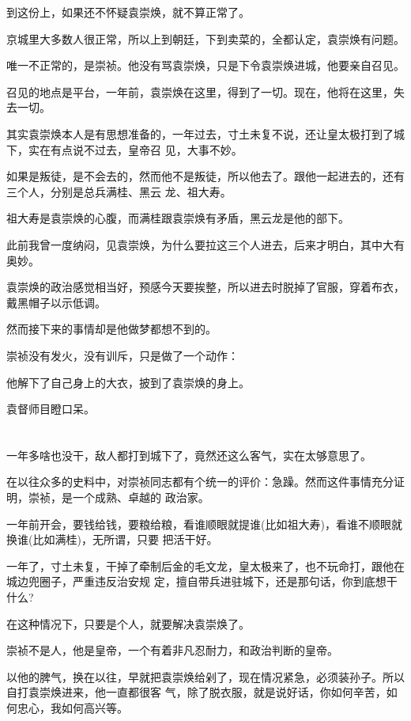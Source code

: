 \documentclass[11pt,a4paper,onecolumn]{article}
\begin{document}
到这份上，如果还不怀疑袁崇焕，就不算正常了。

京城里大多数人很正常，所以上到朝廷，下到卖菜的，全都认定，袁崇焕有问题。

唯一不正常的，是崇祯。他没有骂袁崇焕，只是下令袁崇焕进城，他要亲自召见。

召见的地点是平台，一年前，袁崇焕在这里，得到了一切。现在，他将在这里，失去一切。

其实袁崇焕本人是有思想准备的，一年过去，寸土未复不说，还让皇太极打到了城下，实在有点说不过去，皇帝召
见，大事不妙。

如果是叛徒，是不会去的，然而他不是叛徒，所以他去了。跟他一起进去的，还有三个人，分别是总兵满桂、黑云
龙、祖大寿。

祖大寿是袁崇焕的心腹，而满桂跟袁崇焕有矛盾，黑云龙是他的部下。

此前我曾一度纳闷，见袁崇焕，为什么要拉这三个人进去，后来才明白，其中大有奥妙。

袁崇焕的政治感觉相当好，预感今天要挨整，所以进去时脱掉了官服，穿着布衣，戴黑帽子以示低调。

然而接下来的事情却是他做梦都想不到的。

崇祯没有发火，没有训斥，只是做了一个动作：

他解下了自己身上的大衣，披到了袁崇焕的身上。

袁督师目瞪口呆。

\section[\thesection]{}

一年多啥也没干，敌人都打到城下了，竟然还这么客气，实在太够意思了。

在以往众多的史料中，对崇祯同志都有个统一的评价：急躁。然而这件事情充分证明，崇祯，是一个成熟、卓越的
政治家。

一年前开会，要钱给钱，要粮给粮，看谁顺眼就提谁(比如祖大寿)，看谁不顺眼就换谁(比如满桂)，无所谓，只要
把活干好。

一年了，寸土未复，干掉了牵制后金的毛文龙，皇太极来了，也不玩命打，跟他在城边兜圈子，严重违反治安规
定，擅自带兵进驻城下，还是那句话，你到底想干什么?

在这种情况下，只要是个人，就要解决袁崇焕了。

崇祯不是人，他是皇帝，一个有着非凡忍耐力，和政治判断的皇帝。

以他的脾气，换在以往，早就把袁崇焕给剁了，现在情况紧急，必须装孙子。所以自打袁崇焕进来，他一直都很客
气，除了脱衣服，就是说好话，你如何辛苦，如何忠心，我如何高兴等。
\end{document}
